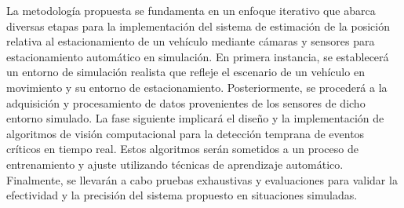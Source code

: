 \noindent
La metodología propuesta se fundamenta en un enfoque iterativo que abarca diversas etapas para la implementación del sistema
de estimación de la posición relativa al estacionamiento de un vehículo mediante cámaras y sensores para estacionamiento automático en simulación.
En primera instancia, se establecerá un entorno de simulación realista que refleje el escenario de un vehículo en movimiento y su entorno de estacionamiento.
Posteriormente, se procederá a la adquisición y procesamiento de datos provenientes de los sensores de dicho entorno simulado.
La fase siguiente implicará el diseño y la implementación de algoritmos de visión computacional para la detección temprana de eventos críticos en tiempo real.
Estos algoritmos serán sometidos a un proceso de entrenamiento y ajuste utilizando técnicas de aprendizaje automático.
Finalmente, se llevarán a cabo pruebas exhaustivas y evaluaciones para validar la efectividad y la precisión del sistema propuesto en situaciones simuladas.